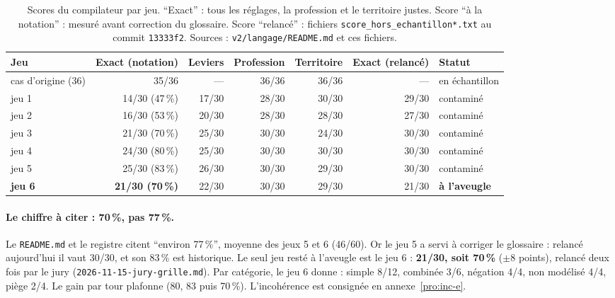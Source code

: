 \begin{table}[htbp]\centering\small
\caption{Scores du compilateur par jeu. \enquote{Exact} : tous les réglages, la profession et le territoire justes. Score \enquote{à la notation} : mesuré avant correction du glossaire. Score \enquote{relancé} : fichiers \texttt{score\_\allowbreak{}hors\_\allowbreak{}echantillon*.txt} au commit \texttt{13333f2}. Sources : \texttt{v2/\allowbreak{}langage/\allowbreak{}README.md} et ces fichiers.}\label{pro:tab-compil}
\setlength{\tabcolsep}{3pt}\begin{tabular}{@{}lrrrrrl@{}}
\toprule
Jeu & Exact (notation) & Leviers & Profession & Territoire & Exact (relancé) & Statut \\ \midrule
cas d'origine (36) & 35/36\mesure{} & --- & 36/36\mesure{} & 36/36\mesure{} & --- & en échantillon \\
jeu 1 & 14/30\mesure{} (47\,\%) & 17/30\mesure{} & 28/30\mesure{} & 30/30\mesure{} & 29/30\mesure{} & contaminé \\
jeu 2 & 16/30\mesure{} (53\,\%) & 20/30\mesure{} & 28/30\mesure{} & 28/30\mesure{} & 27/30\mesure{} & contaminé \\
jeu 3 & 21/30\mesure{} (70\,\%) & 25/30\mesure{} & 30/30\mesure{} & 24/30\mesure{} & 30/30\mesure{} & contaminé \\
jeu 4 & 24/30\mesure{} (80\,\%) & 25/30\mesure{} & 30/30\mesure{} & 30/30\mesure{} & 30/30\mesure{} & contaminé \\
jeu 5 & 25/30\mesure{} (83\,\%) & 26/30\mesure{} & 30/30\mesure{} & 29/30\mesure{} & 30/30\mesure{} & contaminé \\
\textbf{jeu 6} & \textbf{21/30\mesure{} (70\,\%)} & 22/30\mesure{} & 30/30\mesure{} & 29/30\mesure{} & 21/30\mesure{} & \textbf{à l'aveugle} \\
\bottomrule
\end{tabular}
\end{table}

\paragraph{Le chiffre à citer : 70\,\%\mesure{}, pas 77\,\%.}
Le \texttt{README.md} et le registre citent \enquote{environ 77\,\%}\derive{}, moyenne des jeux 5 et 6 (46/60).
Or le jeu 5 a servi à corriger le glossaire : relancé aujourd'hui il vaut 30/30\mesure{}, et son 83\,\% est historique.
Le seul jeu resté à l'aveugle est le jeu 6 : \textbf{21/30, soit 70\,\%}\mesure{} ($\pm8$\derive{} points), relancé deux fois par le jury (\texttt{2026-\allowbreak{}11-\allowbreak{}15-\allowbreak{}jury-\allowbreak{}grille.md}).
Par catégorie, le jeu 6 donne : simple 8/12\mesure{}, combinée 3/6\mesure{}, négation 4/4\mesure{}, non modélisé 4/4\mesure{}, piège 2/4\mesure{}.
Le gain par tour plafonne (80, 83 puis 70\,\%\mesure{}). L'incohérence est consignée en annexe~\ref{pro:inc-e}.

